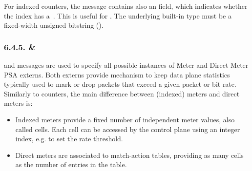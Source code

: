 \documentclass[11pt]{article}
\begin{document}
{%
For indexed counters, the  message contains also an 
field, which indicates whether the index has a~. This is useful for
. The underlying built-in type must
be a fixed-width unsigned bitstring ().%

\subsubsection{6.4.5.\hspace*{0.5em} \& }\label{sec-meter-directmeter}%

\noindent{} and  messages are used to specify all possible instances of
Meter and Direct Meter PSA externs. Both externs provide mechanism to keep data
plane statistics typically used to mark or drop packets that exceed a given
packet or bit rate. Similarly to counters, the main difference between (indexed)
meters and direct meters is:%

\begin{itemize}%

\item{}
Indexed meters provide a fixed number of independent meter values, also called
cells. Each cell can be accessed by the control plane using an integer index,
e.g. to set the rate threshold.%

\item{}
Direct meters are associated to match-action tables, providing as many cells
as the number of entries in the table.%
\end{itemize}%

}
\end{document}
